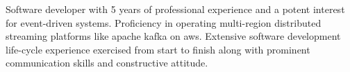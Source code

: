 \begin{cvletter}


Software developer with 5 years of professional experience and a potent interest for event-driven systems. Proficiency in operating multi-region distributed streaming platforms like apache kafka on aws. Extensive software development life-cycle experience exercised from start to finish along with prominent communication skills and constructive attitude. %


\end{cvletter}